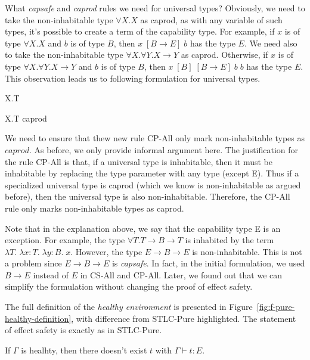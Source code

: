What \emph{capsafe} and \emph{caprod} rules we need for universal
types? Obviously, we need to take the non-inhabitable type
$\forall X.X$ as caprod, as with any variable of such types, it's
possible to create a term of the capability type. For example, if $x$
is of type $\forall X.X$ and $b$ is of type $B$, then
$x \; [B \to E] \; b$ has the type $E$.  We need also to take the
non-inhabitable type $\forall X. \forall Y. X \to Y$ as
caprod. Otherwise, if $x$ is of type $\forall X. \forall Y. X \to Y$
and $b$ is of type $B$, then $x \; [B] \; [B \to E] \; b \; b$ has the
type $E$. This observation leads us to following formulation for
universal types.

{ \forall X.T \quad {} }

{ \forall X.T \quad caprod }

We need to ensure that thew new rule CP-All only mark
non-inhabitable types as $caprod$. As before, we only provide informal
argument here. The justification for the rule CP-All is that, if a
universal type is inhabitable, then it must be inhabitable by
replacing the type parameter with any type (except E). Thus if a
specialized universal type is caprod (which we know is non-inhabitable
as argued before), then the universal type is also
non-inhabitable. Therefore, the CP-All rule only marks non-inhabitable
types as caprod.

Note that in the explanation above, we say that the capability type E
is an exception. For example, the type $\forall T.T \to B \to T$ is
inhabited by the term
$\lambda T. \; \lambda x:T. \; \lambda y:B. \; x$. However, the type
$E \to B \to E$ is non-inhabitable. This is not a problem since
$E \to B \to E$ is \emph{capsafe}. In fact, in the initial
formulation, we used $B \to E$ instead of $E$ in CS-All and
CP-All. Later, we found out that we can simplify the formulation
without changing the proof of effect safety.

The full definition of the \emph{healthy environment} is presented in
Figure~\ref{fig:f-pure-healthy-definition}, with difference from
STLC-Pure highlighted. The statement of effect safety is exactly as in
STLC-Pure.

\begin{definition}
  If $\Gamma$ is healhty, then there doesn't exist $t$ with
  $\Gamma \vdash t : E$.
\end{definition}

